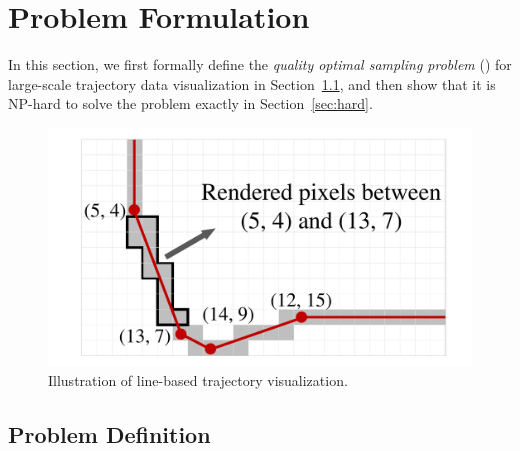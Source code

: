 \section{Problem Formulation}\label{sec:pro}
In this section,
we first formally define the \textit{quality optimal sampling problem} (\prob{}) for large-scale trajectory data visualization in Section~\ref{sec:def},
and then show that it is NP-hard to solve the problem exactly in Section~\ref{sec:hard}.

\begin{figure}
	\centering
	\small
	\includegraphics[width=0.5\columnwidth]{pictures/problemsolveing/RenderedPixels}  
    \trim
	\caption{Illustration of line-based trajectory visualization.} \label{fig:line}
    \trim \trim
\end{figure}


\subsection{Problem Definition}\label{sec:def}

